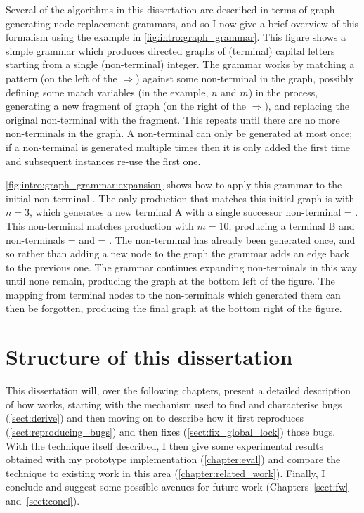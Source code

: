 \noindent
Several of the algorithms in this dissertation are described in terms
of graph generating node-replacement grammars, and so I now give a
brief overview of this formalism using the example in
\autoref{fig:intro:graph_grammar}.  This figure shows a simple grammar
which produces directed graphs of (terminal) capital letters starting
from a single (non-terminal) integer.  The grammar works by matching a
pattern (on the left of the $\Rightarrow$) against some non-terminal
in the graph, possibly defining some match variables (in the example,
$n$ and $m$) in the process, generating a new fragment of graph (on
the right of the $\Rightarrow$), and replacing the original
non-terminal with the fragment.  This repeats until there are no more
non-terminals in the graph.  A non-terminal can only be generated at
most once; if a non-terminal is generated multiple times then it is
only added the first time and subsequent instances re-use the first
one.

\autoref{fig:intro:graph_grammar:expansion} shows how to apply this
grammar to the initial non-terminal .  The only production
that matches this initial graph is  with $n = 3$, which
generates a new terminal A with a single successor non-terminal
 = .  This non-terminal matches production
 with $m=10$, producing a terminal B and non-terminals
= and  =
.  The  non-terminal has already been generated
once, and so rather than adding a new node to the graph the grammar
adds an edge back to the previous one.  The grammar continues
expanding non-terminals in this way until none remain, producing the
graph at the bottom left of the figure.  The mapping from terminal
nodes to the non-terminals which generated them can then be forgotten,
producing the final graph at the bottom right of the figure.

\section{Structure of this dissertation}

This dissertation will, over the following chapters, present a
detailed description of how {\technique} works, starting with the
mechanism used to find and characterise bugs (\autoref{sect:derive})
and then moving on to describe how it first reproduces
(\autoref{sect:reproducing_bugs}) and then fixes
(\autoref{sect:fix_global_lock}) those bugs.  With the technique
itself described, I then give some experimental results obtained with
my prototype implementation {\implementation} (\autoref{chapter:eval})
and compare the technique to existing work in this area
(\autoref{chapter:related_work}).  Finally, I conclude and suggest
some possible avenues for future work (Chapters~\ref{sect:fw}
and~\ref{sect:concl}).
